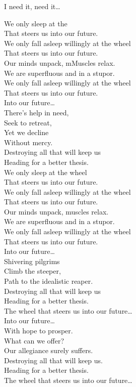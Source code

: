 I need it, need it… \\





We only sleep at the  \\
That steers us into our future. \\
We only fall asleep willingly at the wheel \\
That steers us into our future. \\

Our minds unpack, mMuscles relax. \\
We are superfluous and in a stupor. \\
We only fall asleep willingly at the wheel \\
That steers us into our future. \\

Into our future… \\

There's help in need, \\
Seek to retreat, \\
Yet we decline \\
Without mercy. \\
Destroying all that will keep us \\
Heading for a better thesis. \\

We only sleep at the wheel \\
That steers us into our future. \\
We only fall asleep willingly at the wheel \\
That steers us into our future. \\

Our minds unpack, muscles relax. \\
We are superfluous and in a stupor. \\
We only fall asleep willingly at the wheel \\
That steers us into our future. \\

Into our future… \\

Shivering pilgrims \\
Climb the steeper, \\
Path to the idealistic reaper. \\
Destroying all that will keep us \\
Heading for a better thesis. \\

The wheel that steers us into our future… \\

Into our future… \\

With hope to prosper. \\
What can we offer? \\
Our allegiance surely suffers. \\
Destroying all that will keep us. \\
Heading for a better thesis. \\

The wheel that steers us into our future… \\
